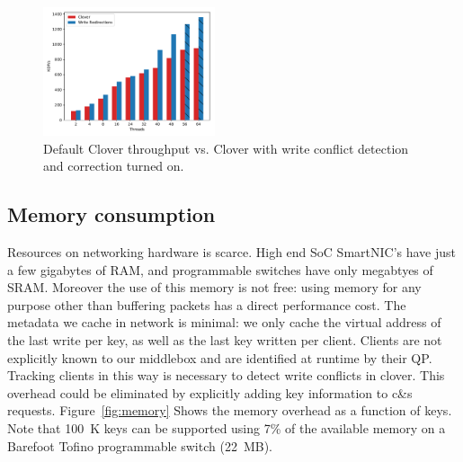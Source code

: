 \begin{figure}
    \includegraphics[width=0.45\textwidth]{fig/throughput.pdf}
    \caption{Default Clover throughput vs. Clover with write conflict
    detection and correction turned on.}
    \label{fig:throughput}
\end{figure}

\subsection{Memory consumption}

Resources on networking hardware is scarce. High end SoC SmartNIC's
have just a few gigabytes of RAM, and programmable switches have only
megabtyes of SRAM. Moreover the use of this memory is not free: using
memory for any purpose other than buffering packets has a direct
performance cost.
The metadata we cache in network is minimal:
we only
cache the virtual address of the last write per key,
as well as the last key written per client. Clients are not
explicitly known to our middlebox and are identified at runtime by
their QP. Tracking clients in this way is necessary to detect write
conflicts in clover. This overhead could be eliminated by explicitly
adding key information to c\&s requests.
%
Figure~\ref{fig:memory} Shows the memory overhead as a function of
keys. Note that 100~K keys can be supported using 7\% of the available
memory on a Barefoot Tofino programmable switch (22~MB).

